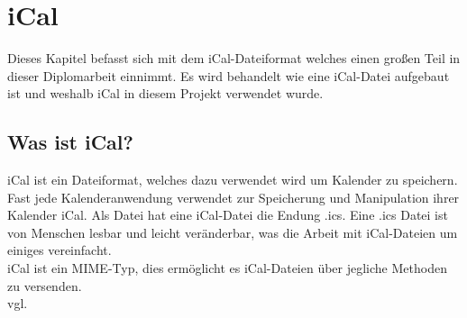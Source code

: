 
\renewcommand{\theauthor}{Matthias Franz}
\chapter{iCal}
\label{sec:iCal}
Dieses Kapitel befasst sich mit dem iCal-Dateiformat welches einen großen Teil in dieser Diplomarbeit einnimmt. Es wird behandelt wie eine iCal-Datei aufgebaut ist und weshalb iCal in diesem Projekt verwendet wurde.

\section{Was ist iCal?}
\label{sec:wasIstiCal?}
iCal ist ein Dateiformat, welches dazu verwendet wird um Kalender zu speichern. Fast jede Kalenderanwendung verwendet zur Speicherung und Manipulation ihrer Kalender iCal. Als Datei hat eine iCal-Datei die Endung .ics. Eine .ics Datei ist von Menschen lesbar und leicht veränderbar, was die Arbeit mit iCal-Dateien um einiges vereinfacht. \\
iCal ist ein MIME-Typ, dies ermöglicht es iCal-Dateien über jegliche Methoden zu versenden.\\vgl. \textcite{iCalDocumentation} 

